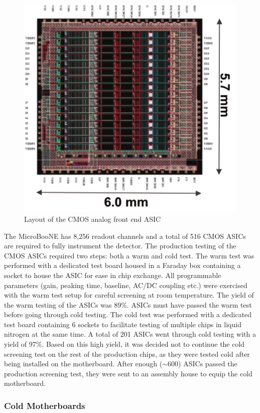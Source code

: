 \begin{figure}[hbt]
\centering
\includegraphics[width=0.75\linewidth]{figures/asic.pdf}
\caption{\label{fig:figasic}Layout of the CMOS analog front end ASIC}
\end{figure}


The MicroBooNE \lartpc has  8,256 readout channels and a total of 516 CMOS ASICs are required to fully instrument the detector. The production testing of the CMOS ASICs required two steps: both a warm and cold test. The warm test was performed with a dedicated test board housed in a Faraday box containing a socket to house the ASIC for ease in chip exchange. All programmable parameters (gain, peaking time, baseline, AC/DC coupling etc.) were exercised with the warm test setup for careful screening at room temperature. The yield of the warm testing of the ASICs was 89\%. ASICs must have passed the warm test before going through cold testing. The cold test was performed with a dedicated test board containing 6 sockets to facilitate testing of multiple chips in liquid nitrogen at the same time. A total of 201 ASICs went through cold testing with a yield of 97\%. Based on this high yield, it was decided not to continue the cold screening test on the rest of the production chips, as they were tested cold after being installed on the motherboard. After enough ($\sim$600) ASICs passed the production screening test, they were sent to an assembly house to equip the cold motherboard.



\subsubsection{Cold Motherboards}

